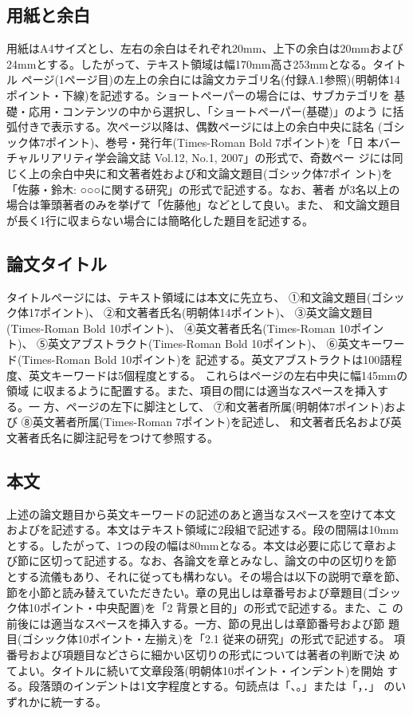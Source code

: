 \documentclass[a4paper,twoside]{jarticle}
\begin{document}
\subsection{用紙と余白}
用紙はA4サイズとし、左右の余白はそれぞれ20mm、上下の余白は20mmおよび
24mmとする。したがって、テキスト領域は幅170mm高さ253mmとなる。タイトル
ページ(1ページ目)の左上の余白には論文カテゴリ名(付録A.1参照)(明朝体14
ポイント・下線)を記述する。ショートペーパーの場合には、サブカテゴリを
基礎・応用・コンテンツの中から選択し、「ショートペーパー(基礎)」のよう
に括弧付きで表示する。次ページ以降は、偶数ページには上の余白中央に誌名
(ゴシック体7ポイント)、巻号・発行年(Times-Roman Bold 7ポイント)を「日
本バーチャルリアリティ学会論文誌 Vol.12, No.1, 2007」の形式で、奇数ペー
ジには同じく上の余白中央に和文著者姓および和文論文題目(ゴシック体7ポイ
ント)を「佐藤・鈴木: ○○○に関する研究」の形式で記述する。なお、著者
が3名以上の場合は筆頭著者のみを挙げて「佐藤他」などとして良い。また、
和文論文題目が長く1行に収まらない場合には簡略化した題目を記述する。

\subsection{論文タイトル}
タイトルページには、テキスト領域には本文に先立ち、
①和文論文題目(ゴシック体17ポイント)、
②和文著者氏名(明朝体14ポイント)、
③英文論文題目(Times-Roman Bold 10ポイント)、
④英文著者氏名(Times-Roman 10ポイント)、
⑤英文アブストラクト(Times-Roman Bold 10ポイント)、
⑥英文キーワード(Times-Roman Bold 10ポイント)を
記述する。英文アブストラクトは100語程度、英文キーワードは5個程度とする。
これらはページの左右中央に幅145mmの領域
に収まるように配置する。また、項目の間には適当なスペースを挿入する。一
方、ページの左下に脚注として、
⑦和文著者所属(明朝体7ポイント)および
⑧英文著者所属(Times-Roman 7ポイント)を記述し、
和文著者氏名および英文著者氏名に脚注記号をつけて参照する。

\subsection{本文}
上述の論文題目から英文キーワードの記述のあと適当なスペースを空けて本文
およびを記述する。本文はテキスト領域に2段組で記述する。段の間隔は10mm
とする。したがって、1つの段の幅は80mmとなる。本文は必要に応じて章およ
び節に区切って記述する。なお、各論文を章とみなし、論文の中の区切りを節
とする流儀もあり、それに従っても構わない。その場合は以下の説明で章を節、
節を小節と読み替えていただきたい。章の見出しは章番号および章題目(ゴシッ
ク体10ポイント・中央配置)を「2 背景と目的」の形式で記述する。また、こ
の前後には適当なスペースを挿入する。一方、節の見出しは章節番号および節
題目(ゴシック体10ポイント・左揃え)を「2.1 従来の研究」の形式で記述する。
項番号および項題目などさらに細かい区切りの形式については著者の判断で決
めてよい。タイトルに続いて文章段落(明朝体10ポイント・インデント)を開始
する。段落頭のインデントは1文字程度とする。句読点は「、。」または「，．」
のいずれかに統一する。
\end{document}
